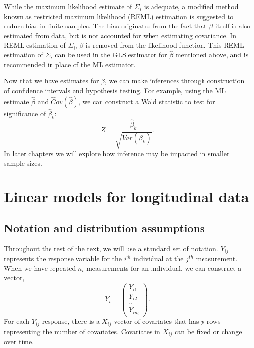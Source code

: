 \documentclass[12pt, twoside]{amherstthesis}
\begin{document}
While the maximum likelihood estimate of \(\Sigma_i\) is adequate, a modified method known as restricted maximum likelihood (REML) estimation is suggested to reduce bias in finite samples. The bias originates from the fact that \(\beta\) itself is also estimated from data, but is not accounted for when estimating covariance. In REML estimation of \(\Sigma_i\), \(\beta\) is removed from the likelihood function. This REML estimation of \(\Sigma_i\) can be used in the GLS estimator for \(\hat\beta\) mentioned above, and is recommended in place of the ML estimator.

Now that we have estimates for \(\beta\), we can make inferences through construction of confidence intervals and hypothesis testing. For example, using the ML estimate \(\hat\beta\) and \(\hat Cov(\hat\beta)\), we can construct a Wald statistic to test for significance of \(\hat \beta_k\):
\[Z = \frac{\hat \beta_k}{\sqrt{\hat Var(\hat \beta_k)}}.\] In later chapters we will explore how inference may be impacted in smaller sample sizes.

\hypertarget{linear-models-for-longitudinal-data}{%
\section{Linear models for longitudinal data}\label{linear-models-for-longitudinal-data}}

\hypertarget{notation-and-distribution-assumptions}{%
\subsection{Notation and distribution assumptions}\label{notation-and-distribution-assumptions}}

Throughout the rest of the text, we will use a standard set of notation. \(Y_{ij}\) represents the response variable for the \(i^{th}\) individual at the \(j^{th}\) measurement. When we have repeated \(n_i\) measurements for an individual, we can construct a vector, \[Y_i = \begin{pmatrix} Y_{i1}\\ Y_{i2} \\ .. \\  Y_{in_i}  \end{pmatrix}.\] For each \(Y_{ij}\) response, there is a \(X_{ij}\) vector of covariates that has \(p\) rows representing the number of covariates. Covariates in \(X_{ij}\) can be fixed or change over time.
\end{document}
